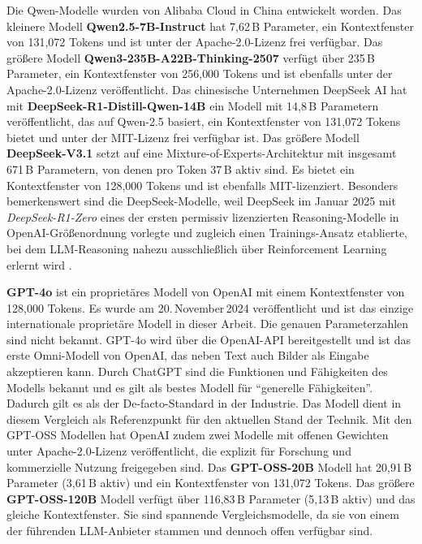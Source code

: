 Die Qwen-Modelle wurden von Alibaba Cloud in China entwickelt worden. Das kleinere Modell \textbf{Qwen2.5-7B-Instruct} \cite{HF_Qwen7B_2025} hat 7,62\,B Parameter, ein Kontextfenster von 131{,}072 Tokens und ist unter der Apache-2.0-Lizenz frei verfügbar. Das größere Modell \textbf{Qwen3-235B-A22B-Thinking-2507} \cite{HF_Qwen3_235B_2025} verfügt über 235\,B Parameter, ein Kontextfenster von 256{,}000 Tokens und ist ebenfalls unter der Apache-2.0-Lizenz veröffentlicht. \textcolor{// TODO Hier noch erwähnen, dass China trotzdem kritisch zu sehen ist, da dort andere Ethik- und Datenschutzstandards in bezug auf das Training von \acp{LLM} gelten.}

Das chinesische Unternehmen DeepSeek AI hat mit \textbf{DeepSeek-R1-Distill-Qwen-14B} \cite{HF_DeepSeekR1_Distill_Qwen14B_2025} ein Modell mit 14{,}8\,B Parametern veröffentlicht, das auf Qwen-2.5 basiert, ein Kontextfenster von 131{,}072 Tokens bietet und unter der MIT-Lizenz frei verfügbar ist. Das größere Modell \textbf{DeepSeek-V3.1} \cite{HF_DeepSeek_V3_1_2025} setzt auf eine Mixture-of-Experts-Architektur mit insgesamt 671\,B Parametern, von denen pro Token 37\,B aktiv sind. Es bietet ein Kontextfenster von 128{,}000 Tokens und ist ebenfalls MIT-lizenziert. Besonders bemerkenswert sind die DeepSeek-Modelle, weil DeepSeek im Januar 2025 mit \emph{DeepSeek-R1-Zero} \cite{HF_DeepSeekR1_Zero_2025} eines der ersten permissiv lizenzierten Reasoning-Modelle in OpenAI-Größenordnung vorlegte und zugleich einen Trainings-Ansatz etablierte, bei dem \ac{LLM}-Reasoning nahezu ausschließlich über Reinforcement Learning erlernt wird \cite{deepseekai2025deepseekr1incentivizingreasoningcapability}.

\textbf{GPT-4o} \cite{openai-hello-gpt-4o} ist ein proprietäres Modell von OpenAI mit einem Kontextfenster von 128{,}000 Tokens. Es wurde am 20.\,November\,2024 veröffentlicht und ist das einzige internationale proprietäre Modell in dieser Arbeit. Die genauen Parameterzahlen sind nicht bekannt. GPT-4o wird über die OpenAI-API bereitgestellt und ist das erste Omni-Modell von OpenAI, das neben Text auch Bilder als Eingabe akzeptieren kann. Durch ChatGPT \cite{chatgpt} sind die Funktionen und Fähigkeiten des Modells bekannt und es gilt als bestes Modell für \enquote{generelle Fähigkeiten}. Dadurch gilt es als der De-facto-Standard in der Industrie. Das Modell dient in diesem Vergleich als Referenzpunkt für den aktuellen Stand der Technik. Mit den GPT-OSS Modellen \cite{OpenAI_GPTOSS_ModelCard_2025} hat OpenAI zudem zwei Modelle mit offenen Gewichten unter Apache-2.0-Lizenz veröffentlicht, die explizit für Forschung und kommerzielle Nutzung freigegeben sind. Das \textbf{GPT-OSS-20B} Modell hat 20,91\,B Parameter (3,61\,B aktiv) und ein Kontextfenster von 131{,}072 Tokens. Das größere \textbf{GPT-OSS-120B} Modell verfügt über 116,83\,B Parameter (5,13\,B aktiv) und das gleiche Kontextfenster. Sie sind spannende Vergleichsmodelle, da sie von einem der führenden \ac{LLM}-Anbieter stammen und dennoch offen verfügbar sind.

